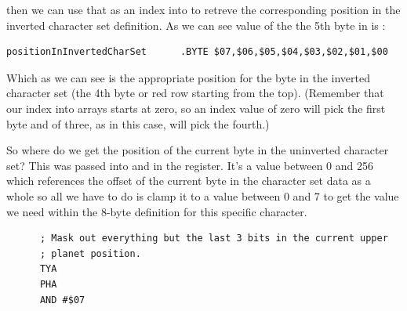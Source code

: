 \begin{figure}[H]
{
  \setlength{\tabcolsep}{3.0pt}
  \setlength\cmidrulewidth{\heavyrulewidth} %
    \begin{adjustbox}{width=6cm,center}
  \begin{subfigure}{0.3\textwidth}
  
  \end{subfigure}
  \end{adjustbox}
}\caption[]{}
\end{figure}


then we can use that as an index into 
to retreve the corresponding position in the inverted character set definition. As we can
see value of the the 5th byte in  is :

\begin{lstlisting}
positionInInvertedCharSet      .BYTE $07,$06,$05,$04,$03,$02,$01,$00
\end{lstlisting}

Which as we can see is the appropriate position for the byte in the inverted character set (the
4th byte or red row starting from the top). (Remember that our index into arrays starts at zero,
so an index value of zero will pick the first byte and of three, as in this case, will pick the fourth.)

\begin{figure}[H]
{
  \setlength{\tabcolsep}{3.0pt}
  \setlength\cmidrulewidth{\heavyrulewidth} %
    \begin{adjustbox}{width=6cm,center}
  \begin{subfigure}{0.3\textwidth}
  
  \end{subfigure}
  \end{adjustbox}
}\caption[]{}
\end{figure}

So where do we get the position of the current byte in the uninverted character set? This was
passed into  and  in the 
register. It's a value between 0 and 256 which references the offset of the current byte
in the character set data as a whole so all we have to do is clamp it to a value between 0 and 7
to get the value we need within the 8-byte definition for this specific character.

\begin{lstlisting}
      ; Mask out everything but the last 3 bits in the current upper
      ; planet position. 
      TYA
      PHA
      AND #$07
\end{lstlisting}

